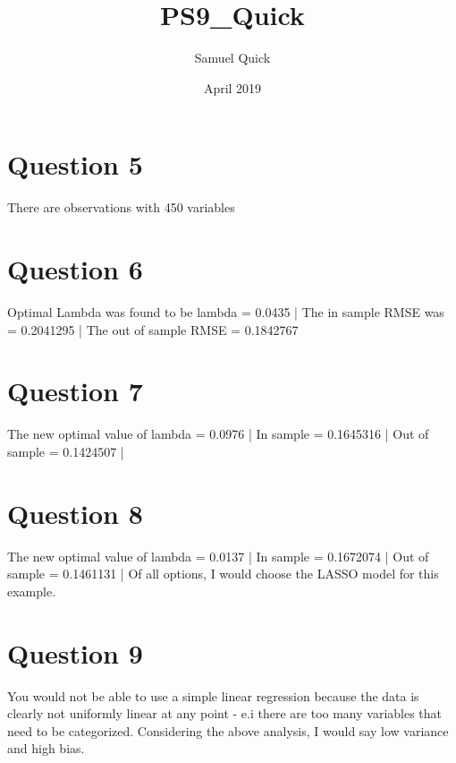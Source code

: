 \documentclass{article}
\title{PS9_Quick}
\author{Samuel Quick}
\date{April 2019}
\begin{document}
\maketitle

\section{Question 5}
There are observations with 450 variables

\section{Question 6}
Optimal Lambda was found to be lambda = 0.0435 | 
The in sample RMSE was = 0.2041295 | 
The out of sample RMSE = 0.1842767

\section{Question 7}
The new optimal value of lambda = 0.0976 | 
In sample = 0.1645316 | 
Out of sample = 0.1424507 | 

\section{Question 8}
The new optimal value of lambda = 0.0137 | 
In sample = 0.1672074 | 
Out of sample = 0.1461131 | 
Of all options, I would choose the LASSO model for this example.

\section{Question 9}
You would not be able to use a simple linear regression because the data is clearly not uniformly linear at any point - e.i there are too many variables that need to be categorized. Considering the above analysis, I would say low variance and high bias.
\end{document}
